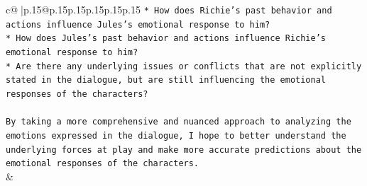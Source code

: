 \documentclass{article}
\begin{document}
{\begin{supertabular}{c@{$\;$}|p{.15\linewidth}@{}p{.15\linewidth}p{.15\linewidth}p{.15\linewidth}p{.15\linewidth}p{.15\linewidth}}
{{{\texttt{* How does Richie's past behavior and actions influence Jules's emotional response to him?} \\
\texttt{* How does Jules's past behavior and actions influence Richie's emotional response to him?} \\
\texttt{* Are there any underlying issues or conflicts that are not explicitly stated in the dialogue, but are still influencing the emotional responses of the characters?} \\
\\ 
\texttt{By taking a more comprehensive and nuanced approach to analyzing the emotions expressed in the dialogue, I hope to better understand the underlying forces at play and make more accurate predictions about the emotional responses of the characters.} \\
            }
        }
    }
    & \\ \\

\end{supertabular}
}
\end{document}
